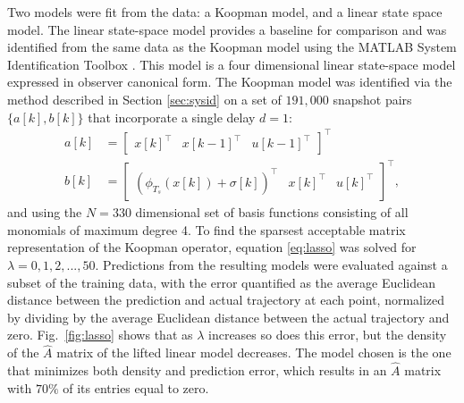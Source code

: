 Two models were fit from the data: a Koopman model, and a linear state space model.
The linear state-space model provides a baseline for comparison and was identified from the same data as the Koopman model using the MATLAB System Identification Toolbox \cite{MATLAB:2017}.
This model is a four dimensional linear state-space model expressed in observer canonical form.
The Koopman model was identified via the method described in Section \ref{sec:sysid} on a set of $191,000$ snapshot pairs $\{ a[k] , b[k] \}$ that incorporate a single delay $d = 1$:
\begin{align}
    a[k] &= \begin{bmatrix} x[k]^\top & x[k-1]^\top & u[k-1]^\top \end{bmatrix}^\top \\
    b[k] &= \begin{bmatrix} \left( \phi_{T_s} (x[k]) + \sigma[k] \right)^\top & x[k]^\top & u[k]^\top \end{bmatrix}^\top,
\end{align}
and using the $N=330$ dimensional set of basis functions consisting of all monomials of maximum degree 4.
To find the sparsest acceptable matrix representation of the Koopman operator, equation \eqref{eq:lasso} was solved for ${ \lambda = 0,1,2, ... ,50 }$.
Predictions from the resulting models were evaluated against a subset of the training data, with the error quantified as the average Euclidean distance between the prediction and actual trajectory at each point, normalized by dividing by the average Euclidean distance between the actual trajectory and zero.
Fig.~\ref{fig:lasso} shows that as $\lambda$ increases so does this error, but the density of the $\hat{A}$ matrix of the lifted linear model decreases.
The model chosen is the one that minimizes both density and prediction error, which results in an $\hat{A}$ matrix with $70 \%$ of its entries equal to zero.

